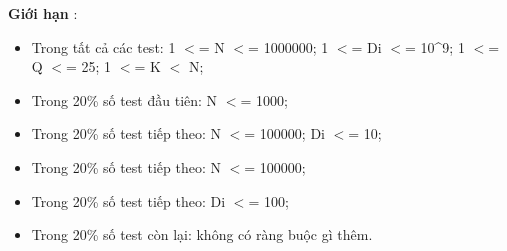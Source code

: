 \textbf{    Giới hạn   }   :  
\begin{itemize}
	\item     Trong tất cả các test: 1 $<$= N $<$= 1000000; 1 $<$= Di $<$= 10\textasciicircum9; 1 $<$= Q $<$= 25; 1 $<$= K $<$ N;   
	\item     Trong 20\% số test đầu tiên: N $<$= 1000;   
	\item     Trong 20\% số test tiếp theo: N $<$= 100000; Di $<$= 10;   
	\item     Trong 20\% số test tiếp theo: N $<$= 100000;   
	\item     Trong 20\% số test tiếp theo: Di $<$= 100;   
	\item     Trong 20\% số test còn lại: không có ràng buộc gì thêm.   
\end{itemize}

